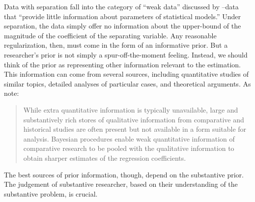 \documentclass[12pt]{article}
\begin{document}
Data with separation fall into the category of ``weak data'' discussed by \cite{WesternJackman1994}--data that ``provide little information about parameters of statistical models.''
Under separation, the data simply offer no information about the upper-bound of the magnitude of the coefficient of the separating variable. 
Any reasonable regularization, then, must come in the form of an informative prior. 
But a researcher's prior is not simply a spur-off-the-moment feeling. 
Instead, we should think of the prior as representing other information relevant to the estimation. 
This information can come from several sources, including quantitative studies of similar topics, detailed analyses of particular cases, and theoretical arguments.
As \citet[p. 415]{WesternJackman1994} note:
\begin{quote}
While extra quantitative information is typically unavailable, large and substantively rich stores of qualitative information from comparative and historical studies are often present but not available in a form suitable for analysis. 
Bayesian procedures enable weak quantitative information of comparative research to be pooled with the qualitative information to obtain sharper estimates of the regression coefficients.
\end{quote}
The best sources of prior information, though, depend on the substantive prior. 
The judgement of substantive researcher, based on their understanding of the substantive problem, is crucial.
\end{document}
